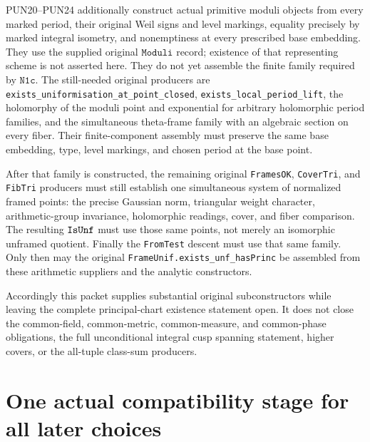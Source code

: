 \documentclass[11pt,a4paper]{article}
\numberwithin{equation}{section}
\theoremstyle{remark}\newtheorem{remark}[theorem]{Remark}
\begin{document}
PUN20--PUN24 additionally construct actual primitive moduli
objects from every marked period, their original Weil signs
and level markings, equality precisely by marked integral
isometry, and nonemptiness at every prescribed base embedding.
They use the supplied original \(\texttt{Moduli}\) record;
existence of that representing scheme is not asserted here.
They do not yet assemble the finite family required by
\(\texttt{N1c}\).  The still-needed original producers are
\texttt{exists\_\allowbreak uniformisation\_\allowbreak at\_\allowbreak point\_\allowbreak closed},
\texttt{exists\_\allowbreak local\_\allowbreak period\_\allowbreak lift}, the holomorphy of the
moduli point and exponential for arbitrary holomorphic period
families, and the simultaneous theta-frame family with an
algebraic section on every fiber.  Their finite-component
assembly must preserve the same base embedding, type, level
markings, and chosen period at the base point.

After that family is constructed, the remaining original
\texttt{Frames\allowbreak OK}, \texttt{Cover\allowbreak Tri}, and \texttt{Fib\allowbreak Tri}
producers must still establish one simultaneous system of
normalized framed points: the precise Gaussian norm,
triangular weight character, arithmetic-group invariance,
holomorphic readings, cover, and fiber comparison.  The
resulting \(\texttt{Is\allowbreak Unf}\) must use those same points,
not merely an isomorphic unframed quotient.  Finally the
\texttt{From\allowbreak Test} descent must use that same family.  Only
then may the original
\texttt{Frame\allowbreak Unif.\allowbreak exists\_\allowbreak unf\_\allowbreak has\allowbreak Princ} be assembled from
these arithmetic suppliers and the analytic constructors.

Accordingly this packet supplies substantial original
subconstructors while leaving the complete principal-chart
existence statement open.  It does not close the common-field,
common-metric, common-measure, and common-phase obligations,
the full unconditional integral cusp spanning statement,
higher covers, or the all-tuple class-sum producers.


\section{One actual compatibility stage for all later choices}
\label{sec:common-compatibility-v48}
\end{document}
